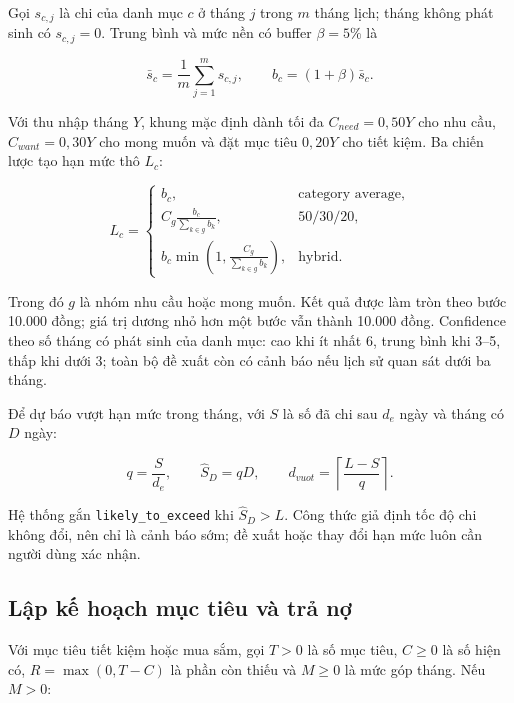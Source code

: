 Gọi $s_{c,j}$ là chi của danh mục $c$ ở tháng $j$ trong $m$ tháng lịch;
tháng không phát sinh có $s_{c,j}=0$. Trung bình và mức nền có buffer
$\beta=5\%$ là

\begin{equation}
  \bar s_c=\frac{1}{m}\sum_{j=1}^{m}s_{c,j},\qquad
  b_c=(1+\beta)\bar s_c.
\end{equation}

Với thu nhập tháng $Y$, khung mặc định dành tối đa
$C_{need}=0{,}50Y$ cho nhu cầu, $C_{want}=0{,}30Y$ cho mong muốn và đặt
mục tiêu $0{,}20Y$ cho tiết kiệm. Ba chiến lược tạo hạn mức thô $L_c$:

\begin{equation}
  L_c=
  \left\{
  \begin{array}{ll}
    b_c,
      & \mbox{category average},\\
    C_g\displaystyle\frac{b_c}{\sum_{k\in g}b_k},
      & \mbox{50/30/20},\\
    b_c\displaystyle\min\left(1,\frac{C_g}{\sum_{k\in g}b_k}\right),
      & \mbox{hybrid}.
  \end{array}
  \right.
\end{equation}

Trong đó $g$ là nhóm nhu cầu hoặc mong muốn. Kết quả được làm tròn theo
bước 10.000 đồng; giá trị dương nhỏ hơn một bước vẫn thành 10.000 đồng.
Confidence theo số tháng có phát sinh của danh mục: cao khi ít nhất 6,
trung bình khi 3--5, thấp khi dưới 3; toàn bộ đề xuất còn có cảnh báo
nếu lịch sử quan sát dưới ba tháng.

Để dự báo vượt hạn mức trong tháng, với $S$ là số đã chi sau $d_e$ ngày
và tháng có $D$ ngày:

\begin{equation}
  q=\frac{S}{d_e},\qquad \widehat S_D=qD,\qquad
  d_{vuot}=\left\lceil\frac{L-S}{q}\right\rceil.
\end{equation}

Hệ thống gắn \texttt{likely\_to\_exceed} khi $\widehat S_D>L$. Công
thức giả định tốc độ chi không đổi, nên chỉ là cảnh báo sớm; đề xuất
hoặc thay đổi hạn mức luôn cần người dùng xác nhận.

\subsection{Lập kế hoạch mục tiêu và trả nợ}

Với mục tiêu tiết kiệm hoặc mua sắm, gọi $T>0$ là số mục tiêu, $C\geq0$
là số hiện có, $R=\max(0,T-C)$ là phần còn thiếu và $M\geq0$ là mức góp
tháng. Nếu $M>0$:

